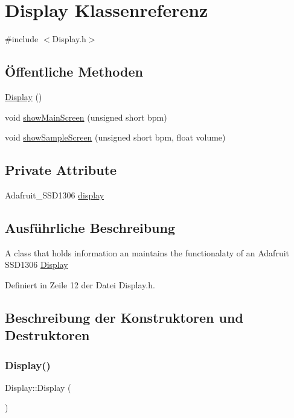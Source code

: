 \hypertarget{class_display}{}\section{Display Klassenreferenz}
\label{class_display}


{\ttfamily \#include $<$Display.\+h$>$}

\subsection*{Öffentliche Methoden}
\begin{DoxyCompactItemize}
\item 
\hyperlink{class_display_ae972fffea6f7ca1d627ef48c3d841bb3}{Display} ()
\item 
void \hyperlink{class_display_aae248dcbc4c44b911c35918feacaf31a}{show\+Main\+Screen} (unsigned short bpm)
\item 
void \hyperlink{class_display_ae00838dd994556524fb8d86d7e855770}{show\+Sample\+Screen} (unsigned short bpm, float volume)
\end{DoxyCompactItemize}
\subsection*{Private Attribute}
\begin{DoxyCompactItemize}
\item 
Adafruit\+\_\+\+S\+S\+D1306 \hyperlink{class_display_ad8b8ca65d118eb16461932c6630463a1}{display}
\end{DoxyCompactItemize}


\subsection{Ausführliche Beschreibung}
A class that holds information an maintains the functionalaty of an Adafruit S\+S\+D1306 \hyperlink{class_display}{Display} 

Definiert in Zeile 12 der Datei Display.\+h.



\subsection{Beschreibung der Konstruktoren und Destruktoren}
\mbox{\label{class_display_ae972fffea6f7ca1d627ef48c3d841bb3}} 
\subsubsection{\texorpdfstring{Display()}{Display()}}
{\footnotesize\ttfamily Display\+::\+Display (\begin{DoxyParamCaption}{ }\end{DoxyParamCaption})}

